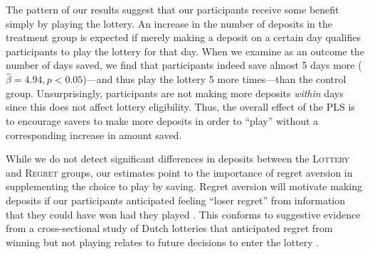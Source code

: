 \documentclass[11pt]{article}
\begin{document}

		The pattern of our results suggest that our participants receive some benefit simply by playing the lottery. An increase in the number of deposits in the treatment group is expected if merely making a deposit on a certain day qualifies participants to play the lottery for that day. When we examine as an outcome the number of days saved, we find that participants indeed save almost 5 days more ($\hat \beta = 4.94, p < 0.05$)---and thus play the lottery 5 more times---than the control group. Unsurprisingly, participants are not making more deposits \textit{within} days since this does not affect lottery eligibility. Thus, the overall effect of the PLS is to encourage savers to make more deposits in order to ``play'' without a corresponding increase in amount saved. %


		While we do not detect significant differences in deposits between the \textsc{Lottery} and \textsc{Regret} groups, our estimates point to the importance of regret aversion in supplementing the choice to play by saving. Regret aversion will motivate making deposits if our participants anticipated feeling ``loser regret'' from information that they could have won had they played . This conforms to suggestive evidence from a cross-sectional study of Dutch lotteries that anticipated regret from winning but not playing relates to future decisions to enter the lottery .



		
		
\end{document}
